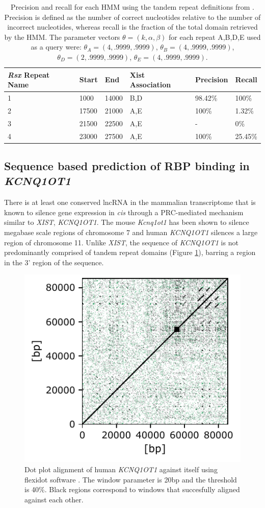 \begin{table}[h!]
\centering
\begin{tabular}{|l|l|l|l|l|l|}
\hline 
\emph{Rsx} Repeat Name& Start & End   & Xist Association   & Precision& Recall                      \\
\hline 
    1&  1000   & 14000    & B,D     & 98.42\% & 100\% \\
      2&17500 & 21000  & A,E     & 100\%   & 1.32\% \\
      3&21500  & 22500   & A,E      & - & 0\%  \\
      4&23000 & 27500  & A,E     & 100\%   & 25.45\% \\
\hline 
\end{tabular}
\caption[\textit{Rsx-Xist} Precision and Recall]{Precision and recall for each HMM using the tandem repeat definitions from \cite{Sprague2019NonlinearDomains}. Precision is defined as the number of correct nucleotides relative to the number of incorrect nucleotides, whereas recall is the fraction of the total domain retrieved by the HMM. The parameter vectors $\theta = (k,\alpha,\beta)$ for each repeat A,B,D,E used as a query were: $\theta_A = (4,.9999,.9999)$, $\theta_B = (4,.9999,.9999)$, $\theta_D = (2,.9999,.9999)$, $\theta_E = (4,.9999,.9999)$.}
\label{tbl:rsxresults}
\end{table}


\subsection{Sequence based prediction of RBP binding in \textit{KCNQ1OT1}}

There is at least one conserved lncRNA in the mammalian transcriptome that is known to silence gene expression in \emph{cis} through a PRC-mediated mechanism similar to \emph{XIST}, \emph{KCNQ1OT1}. The mouse \emph{Kcnq1ot1} has been shown to silence megabase scale regions of chromosome 7 and human \emph{KCNQ1OT1} silences a large region of chromosome 11. Unlike \emph{XIST}, the sequence of \emph{KCNQ1OT1} is not predominantly comprised of tandem repeat domains (Figure \ref{fig:kcndot}), barring a region in the 3' region of the sequence. 

\begin{figure}[h!]
\centering
\includegraphics[width=.35\textwidth]{images/kcnd.pdf}
\caption[\emph{KCNQ1OT1} dot plot alignment]{Dot plot alignment of human \emph{KCNQ1OT1} against itself using flexidot software \cite{Seibt2018FlexiDot:Analyses}. The window parameter is 20bp and the threshold is 40\%. Black regions correspond to windows that succesfully aligned against each other. }
\label{fig:kcndot}
\end{figure}

